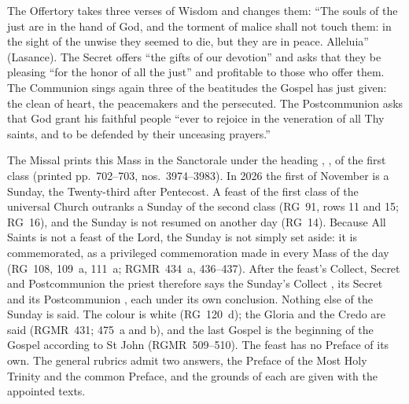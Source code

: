 The Offertory takes three verses of Wisdom and changes them: ``The souls of
the just are in the hand of God, and the torment of malice shall not touch
them: in the sight of the unwise they seemed to die, but they are in peace.
Alleluia'' (Lasance). The Secret offers ``the gifts of our devotion'' and asks
that they be pleasing ``for the honor of all the just'' and profitable to those
who offer them. The Communion sings again three of the beatitudes the Gospel
has just given: the clean of heart, the peacemakers and the persecuted. The
Postcommunion asks that God grant his faithful people ``ever to rejoice in the
veneration of all Thy saints, and to be defended by their unceasing prayers.''

The Missal prints this Mass in the Sanctorale under the heading , , of the first class (printed
pp.~702--703, nos.~3974--3983). In 2026 the first of November is a Sunday, the
Twenty-third after Pentecost. A feast of the first class of the universal
Church outranks a Sunday of the second class (RG~91, rows 11 and 15; RG~16),
and the Sunday is not resumed on another day (RG~14). Because All Saints is not
a feast of the Lord, the Sunday is not simply set aside: it is commemorated, as
a privileged commemoration made in every Mass of the day (RG~108, 109~a,
111~a; RGMR~434~a, 436--437). After the feast's Collect, Secret and
Postcommunion the priest therefore says the Sunday's Collect , its Secret  and its
Postcommunion , each under its own
conclusion. Nothing else of the Sunday is said. The colour is white
(RG~120~d); the Gloria and the Credo are said (RGMR~431; 475~a and b), and the
last Gospel is the beginning of the Gospel according to St John
(RGMR~509--510). The feast has no Preface of its own. The general rubrics
admit two answers, the Preface of the Most Holy Trinity and the common
Preface, and the grounds of each are given with the appointed texts.

